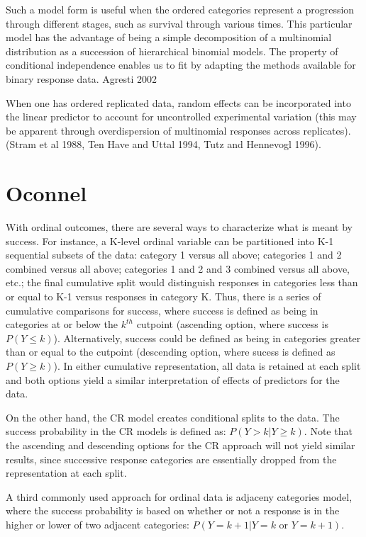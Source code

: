 Such a model form is useful when the ordered categories represent a progression through different stages, such as survival through various times. This particular model has the advantage of being a simple decomposition of a multinomial distribution as a succession of hierarchical binomial models. The property of conditional independence enables us to fit by adapting the methods available for binary response data. Agresti 2002

When one has ordered replicated data, random effects can be incorporated into the linear predictor to account for uncontrolled experimental variation (this may be apparent through overdispersion of multinomial responses across replicates). (Stram et al 1988, Ten Have and Uttal 1994, Tutz and Hennevogl 1996).

\section{Oconnel}

With ordinal outcomes, there are several ways to characterize what is meant by success. For instance, a K-level ordinal variable can be partitioned into K-1 sequential subsets of the data: category 1 versus all above; categories 1 and 2 combined versus all above; categories 1 and 2 and 3 combined versus all above, etc.; the final cumulative split would distinguish responses in categories less than or equal to K-1 versus responses in category K. Thus, there is a series of cumulative comparisons for success, where success is defined as being in categories at or below the $k^{th}$ cutpoint (ascending option, where success is $P(Y \leq k)$). Alternatively, success could be defined as being in categories greater than or equal to the cutpoint (descending option, where sucess is defined as $P(Y \geq k)$). In either cumulative representation, all data is retained at each split and both options yield a similar interpretation of effects of predictors for the data.

On the other hand, the CR model creates conditional splits to the data. The success probability in the CR models is defined as: $P(Y > k | Y \geq k)$. Note that the ascending and descending options for the CR approach will not yield similar results, since successive response categories are essentially dropped from the representation at each split.

A third commonly used approach for ordinal data is adjaceny categories model, where the success probability is based on whether or not a response is in the higher or lower of two adjacent categories: $P(Y=k+1 | Y=k \text{ or } Y=k+1)$.


